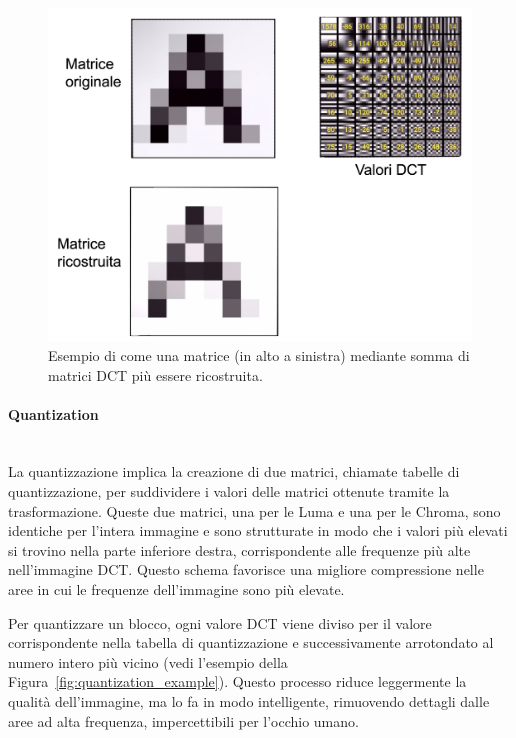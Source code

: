 \documentclass[a4paper,12pt, oneside]{article}
\begin{document}
\begin{figure}[h]
    \centering
    \includegraphics[width=1\textwidth]{images/DCT-example.png}
    \caption{Esempio di come una matrice (in alto a sinistra) mediante somma di matrici DCT
    più essere ricostruita.}
    \label{fig:DCT_example}
\end{figure}

\paragraph{Quantization}\hphantom{A}\\
La quantizzazione implica la creazione di due matrici, chiamate tabelle di quantizzazione, per
suddividere i valori delle matrici ottenute tramite la trasformazione. Queste due matrici, una
per le Luma e una per le Chroma, sono identiche per l'intera immagine e sono strutturate in
modo che i valori più elevati si trovino nella parte inferiore destra, corrispondente alle
frequenze più alte nell'immagine DCT. Questo schema favorisce una migliore compressione nelle
aree in cui le frequenze dell'immagine sono più elevate.

Per quantizzare un blocco, ogni valore DCT viene diviso per il valore corrispondente nella
tabella di quantizzazione e successivamente arrotondato al numero intero più vicino (vedi
l'esempio della Figura~\ref{fig:quantization_example}). Questo processo riduce leggermente la
qualità dell'immagine, ma lo fa in modo intelligente, rimuovendo dettagli dalle aree ad alta
frequenza, impercettibili per l'occhio umano.
\end{document}

